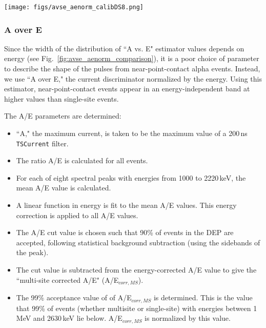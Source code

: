 \documentclass[groupedaddress,rmp,amsmath,amssymb,bibnotes,altaffilletter,twocolumn]{revtex4-1}
\begin{document}
\begin{figure*}[]
 \centering
 \texttt{[image: figs/avse\_aenorm\_calibDS8.png]}
 \caption{A comparison of A vs. E {\it (left)} and A/E {\it (right)} in calibration events (from calibration data set 8) after the muon veto is applied. The color scale indicates the number of events. Near point-contact events have energy-dependent values of A vs. E, as seen in the sloped upper edge of the A vs. E distribution when it is drawn with respect to energy, but have energy-independent values of A/E. Therefore, A/E is used to identify near-point-contact events.} 
 \label{fig:avse_aenorm_comparison}
\end{figure*}

\subsubsection{A over E}
Since the width of the distribution of ``A vs. E" estimator values depends on energy (see Fig.~\ref{fig:avse_aenorm_comparison}), it is a poor choice of parameter to describe the shape of the pulses from near-point-contact alpha events. Instead, we use ``A over E," the current discriminator normalized by the energy. Using this estimator, near-point-contact events appear in an energy-independent band at higher values than single-site events. 

The A/E parameters are determined: 
\begin{itemize}
\item ``A," the maximum current, is taken to be the maximum value of a 200\,ns {\tt TSCurrent} filter.
\item The ratio A/E is calculated for all events.
\item For each of eight spectral peaks with energies from 1000 to 2220\,keV, the mean A/E value is calculated.
\item A linear function in energy is fit to the mean A/E values. This energy correction is applied to all A/E values. 
\item The A/E cut value is chosen such that 90\% of events in the DEP are accepted, following statistical background subtraction (using the sidebands of the peak).
\item The cut value is subtracted from the energy-corrected A/E value to give the ``multi-site corrected A/E" (A/E$_{corr, MS}$).
\item The 99\% acceptance value of of A/E$_{corr, MS}$ is determined. This is the value that 99\% of events (whether multisite or single-site) with energies between 1\,MeV and 2630\,keV lie below. A/E$_{corr, MS}$ is normalized by this value.
\end{itemize}
\end{document}
